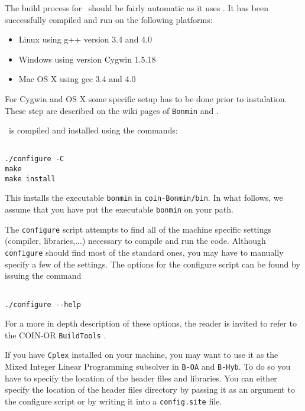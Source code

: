 The build process for \Bonmin\ should be fairly automatic as it uses
.
  It has been successfully compiled and run on the following platforms:
\begin{itemize}
\item Linux using g++ version 3.4 and 4.0
\item Windows using version Cygwin 1.5.18
\item Mac OS X using gcc 3.4 and 4.0
\end{itemize}

For Cygwin and OS X some specific setup has to be done prior to instalation. These step are described on the wiki pages of {\tt Bonmin}   and .


\Bonmin\ is compiled and installed using the commands:
\begin{verbatim}

./configure -C
make
make install

\end{verbatim}

This installs the executable {\tt bonmin} in {\tt coin-Bonmin/bin}. In what follows, we assume
that you have put the executable {\tt bonmin} on your path.

The {\tt configure} script attempts to find all of the machine specific settings (compiler, libraries,...)
necessary to compile and run the code. Although {\tt configure} should find most of the standard
ones, you may have to manually specify a few of the settings.
The options for the configure script can be found by issuing the command
\begin{verbatim}

./configure --help

\end{verbatim}
For a more in depth description of these options,
the reader is invited to refer to the COIN-OR {\tt BuildTools} .

If you have {\tt Cplex} installed on your machine, you may want to use it
as the Mixed Integer Linear Programming subsolver in {\tt B-OA} and {\tt B-Hyb}.
To do so you have to specify the location of the header files and libraries.
You can either specify the location of the header files directory by passing it as an
argument to the configure script or by writing it into a {\tt config.site} file.\\

